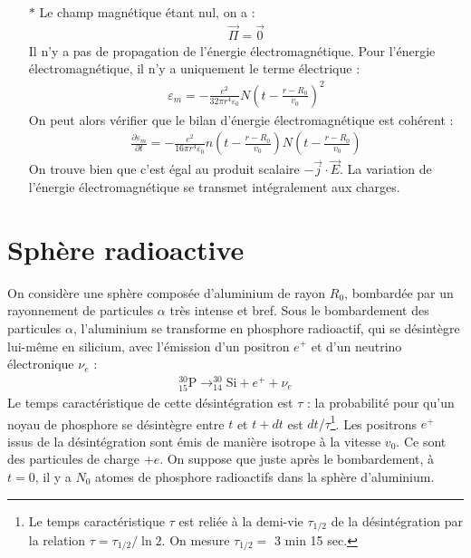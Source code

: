 \documentclass{report}
\begin{document}
\begin{itemize}
	\item[$\ast$] Le champ magnétique étant nul, on a :
	\begin{align*}
		\vec{\Pi}=\vec{0}
	\end{align*}
	Il n'y a pas de propagation de l'énergie électromagnétique. Pour l'énergie électromagnétique, il n'y a uniquement le terme électrique :
	\begin{align*}
		\varepsilon_m=-\frac{e^2}{32\pi r^4\varepsilon_0}N\left( t-\frac{r-R_0}{v_0}\right)^2
	\end{align*}
	On peut alors vérifier que le bilan d'énergie électromagnétique est cohérent :
		\begin{align*}
		\frac{\partial \varepsilon_m}{\partial t}=-\frac{e^2}{16\pi r^4\varepsilon_0}n\left( t-\frac{r-R_0}{v_0}\right)N\left( t-\frac{r-R_0}{v_0}\right)
	\end{align*}
	On trouve bien que c'est égal au produit scalaire $-\vec{j}\cdot\vec{E}$. La variation de l'énergie électromagnétique se transmet intégralement aux charges.

\end{itemize}

\newpage

\section*{Sphère radioactive}

On considère une sphère composée d'aluminium de rayon $R_0$, bombardée par un rayonnement de particules $\alpha$ très intense et bref. Sous le bombardement des particules $\alpha$, l'aluminium se transforme en phosphore radioactif, qui se désintègre lui-même en silicium, avec l'émission d'un positron $e^+$ et d'un neutrino électronique $\nu_e$ :
\begin{align*}
	^{30}_{15}\mathrm{P}\longrightarrow^{30}_{14}\mathrm{Si}+e^++\nu_e
\end{align*}
Le temps caractéristique de cette désintégration est $\tau$ : la probabilité pour qu'un noyau de phosphore se désintègre entre $t$ et $t+dt$ est $dt/\tau$\footnote{Le temps caractéristique $\tau$ est reliée à la demi-vie $\tau_{1/2}$ de la désintégration par la relation $\tau=\tau_{1/2}/\ln2$. On mesure $\tau_{1/2}=$ 3 min 15 sec.}. Les positrons $e^+$ issus de la désintégration sont émis de manière isotrope à la vitesse $v_0$. Ce sont des particules de charge $+e$.
On suppose que juste après le bombardement, à $t=0$, il y a $N_0$ atomes de phosphore radioactifs dans la sphère d'aluminium.
\end{document}
